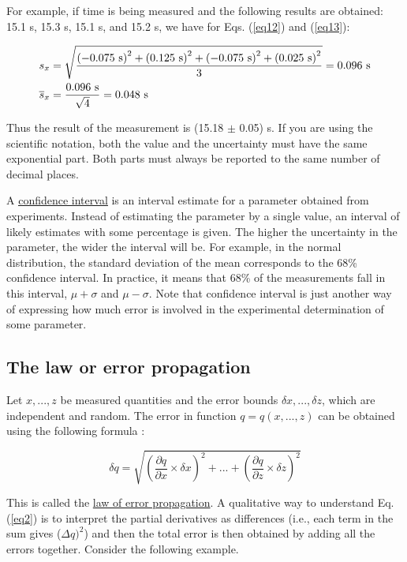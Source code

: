 \documentclass[byrevtex,amssymb,aps,pra,floatfix,letterpaper]{revtex4}
\begin{document}
\noindent
For example, if time is being measured and the following results are obtained: 15.1 s, 15.3 s, 15.1
s, and 15.2 s, we have for Eqs. (\ref{eq12}) and (\ref{eq13}):

\begin{eqnarray}
\label{eq14}
& s_x = \sqrt{\frac{\left(-0.075\textnormal{ s}\right)^2 + \left(0.125\textnormal{ s}\right)^2 + \left(-0.075\textnormal{ s}\right)^2 + \left(0.025\textnormal{ s}\right)^2}{3}} = 0.096\textnormal{ s}\\
\nonumber
& \overline{s}_x = \frac{0.096\textnormal{ s}}{\sqrt{4}} = 0.048\textnormal{ s}
\end{eqnarray}

\noindent
Thus the result of the measurement is (15.18 $\pm$ 0.05) s. If you are using the scientific notation, both the value and the uncertainty must have the same exponential part. Both parts must always be reported to the same number of decimal places.

A \href{http://en.wikipedia.org/wiki/Confidence_interval}{\underline{confidence interval}} is an interval estimate for a parameter obtained from experiments. Instead of estimating the parameter by a single value, an interval of likely estimates with some percentage is given. The higher the uncertainty in the parameter, the wider the interval will be. For example, in the normal distribution, the standard deviation of the mean corresponds to the 68\% confidence interval. In practice, it means that 68\% of the measurements fall in this interval, $\mu + \sigma$ and $\mu - \sigma$. Note that confidence interval is just another way of expressing how much error is involved in the experimental determination of some parameter.

\subsection{The law or error propagation}

Let $x, ..., z$ be measured quantities and the error bounds $\delta x, ..., \delta z$, which are independent and
random. The error in function $q = q(x, ..., z)$ can be obtained using the following formula
\cite{TAYLOR}:

\begin{equation}
\label{eq2}
\delta q = \sqrt{\left(\frac{\partial q}{\partial x}\times\delta x\right)^2 + ... + \left(\frac{\partial q}{\partial z}\times\delta z\right)^2}
\end{equation}

\noindent
This is called the \href{http://en.wikipedia.org/wiki/Error_propagation}{law of error propagation}. A qualitative way to understand Eq. (\ref{eq2}) is to
interpret the partial derivatives as differences (i.e., each term in the sum gives ($\Delta q)^2$) and then the
total error is then obtained by adding all the errors together. Consider the following example.\\
\end{document}

